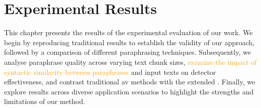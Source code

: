 \chapter{Experimental Results}
\label{chap:experimental_results}

This chapter presents the results of the experimental evaluation of our work. 
We begin by reproducing traditional results to establish the validity of our approach, followed by a comparison of different paraphrasing techniques. 
Subsequently, we analyse paraphrase quality across varying text chunk sizes, \textcolor{orange}{examine the impact of syntactic similarity between paraphrases} and input texts on detector effectiveness, and contrast traditional \ac{av} methods with the extended \impAppr{}. 
Finally, we explore results across diverse application scenarios to highlight the strengths and limitations of our method. 










% 

% 

% 


